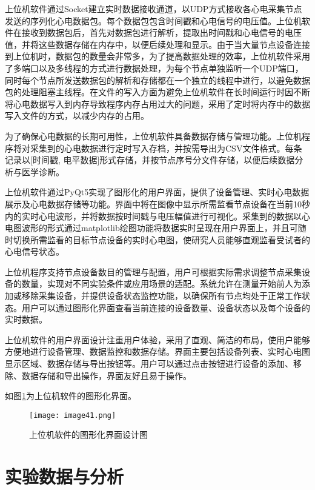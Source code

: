 上位机软件通过Socket建立实时数据接收通道，以UDP方式接收各心电采集节点发送的序列化心电数据包。每个数据包包含时间戳和心电信号的电压值。上位机软件在接收到数据包后，首先对数据包进行解析，提取出时间戳和心电信号的电压值，并将这些数据存储在内存中，以便后续处理和显示。由于当大量节点设备连接到上位机时，数据包的数量会非常多，为了提高数据处理的效率，上位机软件采用了多端口以及多线程的方式进行数据处理，为每个节点单独监听一个UDP端口，同时每个节点所发送数据包的解析和存储都在一个独立的线程中进行，以避免数据包的处理阻塞主线程。在文件的写入方面为避免上位机软件在长时间运行时因不断将心电数据写入到内存导致程序内存占用过大的问题，采用了定时将内存中的数据写入文件的方式，以减少内存的占用。

为了确保心电数据的长期可用性，上位机软件具备数据存储与管理功能。上位机程序将对采集到的心电数据进行定时写入存档，并按需导出为CSV文件格式。每条记录以[时间戳, 电平数据]形式存储，并按节点序号分文件存储，以便后续数据分析与医学诊断。

上位机软件通过PyQt5实现了图形化的用户界面，提供了设备管理、实时心电数据展示及心电数据存储等功能。界面中将在图像中显示所需监看节点设备在当前10秒内的实时心电波形，并将数据按时间戳与电压幅值进行可视化。采集到的数据以心电图波形的形式通过matplotlib绘图功能将数据实时呈现在用户界面上，并且可随时切换所需监看的目标节点设备的实时心电图，使研究人员能够直观监看受试者的心电信号状态。

上位机程序支持节点设备数目的管理与配置，用户可根据实际需求调整节点采集设备的数量，实现对不同实验条件或应用场景的适配。系统允许在测量开始前人为添加或移除采集设备，并提供设备状态监控功能，以确保所有节点均处于正常工作状态。用户可以通过图形化界面查看当前连接的设备数量、设备状态以及每个设备的实时数据。

上位机软件的用户界面设计注重用户体验，采用了直观、简洁的布局，使用户能够方便地进行设备管理、数据监控和数据存储。界面主要包括设备列表、实时心电图显示区域、数据存储与导出按钮等。用户可以通过点击按钮进行设备的添加、移除、数据存储和导出操作，界面友好且易于操作。

如图\ref{F.ECG_image41}为上位机软件的图形化界面。

\begin{figure}[htb]
    \centering
    \texttt{[image: image41.png]}
    \caption{上位机软件的图形化界面设计图}
    \label{F.ECG_image41}
\end{figure}


\section{实验数据与分析}


